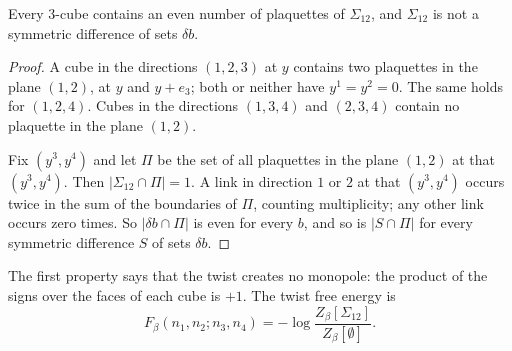 \begin{lemma}\label{ym:lem:thooft-class}
Every 3-cube contains an even number of plaquettes of $\Sigma_{12}$, and
$\Sigma_{12}$ is not a symmetric difference of sets $\delta b$.
\end{lemma}
\begin{proof}
A cube in the directions $(1,2,3)$ at $y$ contains two plaquettes in the
plane $(1,2)$, at $y$ and $y+e_3$; both or neither have $y^1=y^2=0$. The same
holds for $(1,2,4)$. Cubes in the directions $(1,3,4)$ and $(2,3,4)$ contain
no plaquette in the plane $(1,2)$.

Fix $(y^3,y^4)$ and let $\Pi$ be the set of all plaquettes in the plane
$(1,2)$ at that $(y^3,y^4)$. Then $|\Sigma_{12}\cap\Pi|=1$. A link in
direction $1$ or $2$ at that $(y^3,y^4)$ occurs twice in the sum of the boundaries
of $\Pi$, counting multiplicity; any other link occurs zero times. So $|\delta b\cap\Pi|$ is even for every
$b$, and so is $|S\cap\Pi|$ for every symmetric difference $S$ of sets
$\delta b$.
\end{proof}
The first property says that the twist creates no monopole: the product of
the signs over the faces of each cube is $+1$. The twist free energy is
\begin{equation}\label{ym:twist-free-energy}
 F_\beta(n_1,n_2;n_3,n_4)=-\log\frac{Z_\beta[\Sigma_{12}]}{Z_\beta[\emptyset]}.
\end{equation}
